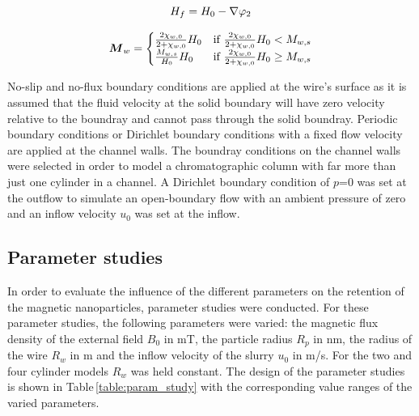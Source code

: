 \begin{equation}
\label{eq:loc_mag_field}
\centering
H_{f}=H_{0}-\nabla\varphi_{2}
\end{equation}

\begin{equation}
\label{eq:mag_wire}
\centering
\boldsymbol{M}_{w}= 
                 \begin{cases}
                    \frac{2\chi_{w,0}}{2+\chi_{w,0}}H_{0} & \text{if}\ \frac{2\chi_{w,0}}{2+\chi_{w,0}}H_{0}<M_{w,s} \\
                    \frac{M_{w,s}}{H_{0}}H_{0} & \text{if}\ \frac{2\chi_{w,0}}{2+\chi_{w,0}}H_{0}\geq M_{w,s} \\
                 \end{cases}
\end{equation}

No-slip and no-flux boundary conditions are applied at the wire's surface as it is assumed that the fluid velocity at the solid boundary will have zero velocity relative to the boundray and cannot pass through the solid boundray. Periodic boundary conditions or Dirichlet boundary conditions with a fixed flow velocity are applied at the channel walls. The boundray conditions on the channel walls were selected in order to model a chromatographic column with far more than just one cylinder in a channel. A Dirichlet boundary condition of $p$=0 was set at the outflow to simulate an open-boundary flow with an ambient pressure of zero and an inflow velocity $u_{0}$ was set at the inflow.


\subsection{Parameter studies}
\label{subsec:Param_studies} 
In order to evaluate the influence of the different parameters on the retention of the magnetic nanoparticles, parameter studies were conducted. For these parameter studies, the following parameters were varied: the magnetic flux density of the external field $B_{0}$ in mT, the particle radius $R_{p}$ in nm, the radius of the wire $R_{w}$ in \textmu m and the inflow velocity of the slurry $u_{0}$ in \textmu m/s. For the two and four cylinder models $R_{w}$ was held constant. The design of the parameter studies is shown in Table\,\ref{table:param_study} with the corresponding value ranges of the varied parameters. 

